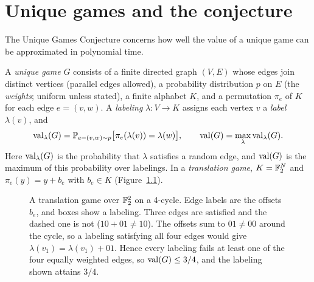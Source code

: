 \chapter{Unique games and the conjecture}\label{ch:ug}

The Unique Games Conjecture concerns how well the value of a unique game can be approximated in polynomial time.

\begin{definition}\label{def:ug}
A \emph{unique game} $G$ consists of a finite directed graph $(V,E)$ whose edges join distinct vertices (parallel edges allowed), a probability distribution $p$ on $E$ (the \emph{weights}; uniform unless stated), a finite alphabet $K$, and a permutation $\pi_e$ of $K$ for each edge $e=(v,w)$. A \emph{labeling} $\lambda:V\to K$ assigns each vertex $v$ a \emph{label} $\lambda(v)$, and
\[
\operatorname{val}_\lambda(G)=\mathbb{P}_{e=(v,w)\sim p}\bigl[\pi_e(\lambda(v))=\lambda(w)\bigr],\qquad \operatorname{val}(G)=\max_\lambda\operatorname{val}_\lambda(G).
\]
Here $\operatorname{val}_\lambda(G)$ is the probability that $\lambda$ satisfies a random edge, and $\operatorname{val}(G)$ is the maximum of this probability over labelings.
In a \emph{translation game}, $K=\mathbb{F}_2^N$ and $\pi_e(y)=y+b_e$ with $b_e\in K$ (Figure~\ref{fig:ugexample}).
\end{definition}

\begin{figure}[ht]
\centering
{}
\caption{A translation game over $\mathbb{F}_2^2$ on a 4-cycle. Edge labels are the offsets $b_e$, and boxes show a labeling. Three edges are satisfied and the dashed one is not ($10+01\ne10$). The offsets sum to $01\ne00$ around the cycle, so a labeling satisfying all four edges would give $\lambda(v_1)=\lambda(v_1)+01$. Hence every labeling fails at least one of the four equally weighted edges, so $\operatorname{val}(G)\le3/4$, and the labeling shown attains $3/4$.}\label{fig:ugexample}
\end{figure}

